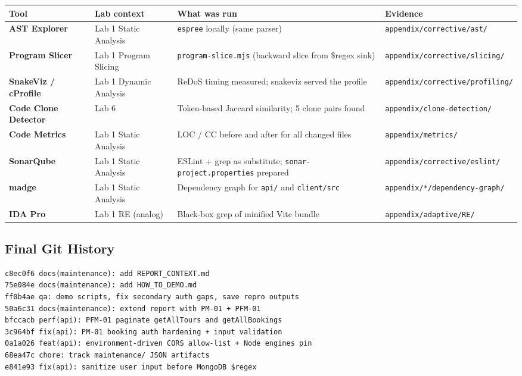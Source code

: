 \documentclass[11pt,a4paper]{article}
\begin{document}
\begin{longtable}{@{}p{2.2cm}p{3.5cm}p{4.5cm}p{3cm}@{}}
\toprule
\textbf{Tool} & \textbf{Lab context} & \textbf{What was run} & \textbf{Evidence} \\
\midrule
\endhead
\textbf{AST Explorer} & Lab 1 Static Analysis &
  \texttt{espree} locally (same parser) &
  \texttt{appendix/corrective/ast/} \\[3pt]
\textbf{Program Slicer} & Lab 1 Program Slicing &
  \texttt{program-slice.mjs} (backward slice from \$regex sink) &
  \texttt{appendix/corrective/slicing/} \\[3pt]
\textbf{SnakeViz / cProfile} & Lab 1 Dynamic Analysis &
  ReDoS timing measured; snakeviz served the profile &
  \texttt{appendix/corrective/profiling/} \\[3pt]
\textbf{Code Clone Detector} & Lab 6 &
  Token-based Jaccard similarity; 5 clone pairs found &
  \texttt{appendix/clone-detection/} \\[3pt]
\textbf{Code Metrics} & Lab 1 Static Analysis &
  LOC / CC before and after for all changed files &
  \texttt{appendix/metrics/} \\[3pt]
\textbf{SonarQube} & Lab 1 Static Analysis &
  ESLint + grep as substitute; \texttt{sonar-project.properties} prepared &
  \texttt{appendix/corrective/eslint/} \\[3pt]
\textbf{madge} & Lab 1 Static Analysis &
  Dependency graph for \texttt{api/} and \texttt{client/src} &
  \texttt{appendix/*/dependency-graph/} \\[3pt]
\textbf{IDA Pro} & Lab 1 RE (analog) &
  Black-box grep of minified Vite bundle &
  \texttt{appendix/adaptive/RE/} \\
\bottomrule
\end{longtable}

\subsection*{Final Git History}

\begin{lstlisting}
c8ec0f6 docs(maintenance): add REPORT_CONTEXT.md
75e084e docs(maintenance): add HOW_TO_DEMO.md
ff0b4ae qa: demo scripts, fix secondary auth gaps, save repro outputs
50a6c31 docs(maintenance): extend report with PM-01 + PFM-01
bfccacb perf(api): PFM-01 paginate getAllTours and getAllBookings
3c964bf fix(api): PM-01 booking auth hardening + input validation
0a1a026 feat(api): environment-driven CORS allow-list + Node engines pin
68ea47c chore: track maintenance/ JSON artifacts
e841e93 fix(api): sanitize user input before MongoDB $regex
\end{lstlisting}
\end{document}
